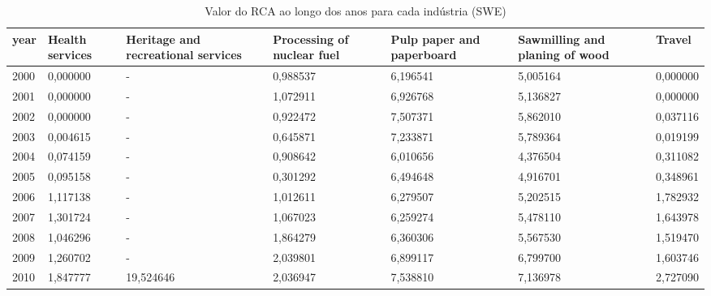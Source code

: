 \begin{table}
\centering
\caption{Valor do RCA ao longo dos anos para cada indústria (SWE)}
\begin{tabular}{p{1cm}p{2cm}p{2cm}p{2cm}p{2cm}p{2cm}p{2cm}}
\toprule
 year &  Health services &  Heritage and recreational services &  Processing of nuclear fuel &  Pulp paper and paperboard &  Sawmilling and planing of wood &   Travel \\
\midrule
 2000 &         0,000000 &                                   - &                    0,988537 &                   6,196541 &                        5,005164 & 0,000000 \\
 2001 &         0,000000 &                                   - &                    1,072911 &                   6,926768 &                        5,136827 & 0,000000 \\
 2002 &         0,000000 &                                   - &                    0,922472 &                   7,507371 &                        5,862010 & 0,037116 \\
 2003 &         0,004615 &                                   - &                    0,645871 &                   7,233871 &                        5,789364 & 0,019199 \\
 2004 &         0,074159 &                                   - &                    0,908642 &                   6,010656 &                        4,376504 & 0,311082 \\
 2005 &         0,095158 &                                   - &                    0,301292 &                   6,494648 &                        4,916701 & 0,348961 \\
 2006 &         1,117138 &                                   - &                    1,012611 &                   6,279507 &                        5,202515 & 1,782932 \\
 2007 &         1,301724 &                                   - &                    1,067023 &                   6,259274 &                        5,478110 & 1,643978 \\
 2008 &         1,046296 &                                   - &                    1,864279 &                   6,360306 &                        5,567530 & 1,519470 \\
 2009 &         1,260702 &                                   - &                    2,039801 &                   6,899117 &                        6,799700 & 1,603746 \\
 2010 &         1,847777 &                           19,524646 &                    2,036947 &                   7,538810 &                        7,136978 & 2,727090 \\

\end{tabular}
\end{table}
